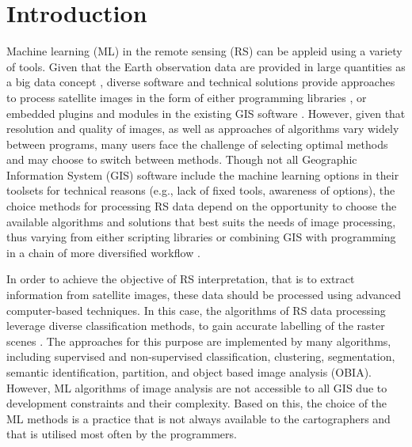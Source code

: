 \documentclass[final,5p,times,twocolumn]{elsarticle}
\begin{document}
\section{Introduction}

Machine learning (ML) in the remote sensing (RS) can be appleid using a variety of tools. Given that the Earth observation data are provided in large quantities as a big data concept \cite{LI2023103345,YIN2021102514,HUANG20181915}, diverse software and technical solutions provide approaches to process satellite images in the form of either programming libraries \cite{9884758,Lemenkova202306,9297369,9553880}, or embedded plugins and modules in the existing GIS software \cite{Lemenkova202307,rs15041148}. However, given that resolution and quality of images, as well as approaches of algorithms vary widely between programs, many users face the challenge of selecting optimal methods and may choose to switch between methods. Though not all Geographic Information System (GIS) software include the machine learning options in their toolsets for technical reasons (e.g., lack of fixed tools, awareness of options), the choice methods  for processing RS data depend on the opportunity to choose the available algorithms and solutions that best suits the needs of image processing, thus varying from either scripting libraries or combining GIS with programming in a chain of more diversified workflow \citep{5070195,Lemenkova202227,4736879,6049966,Lemenkova202301,6910592}.

In order to achieve the objective of RS interpretation, that is to extract information from satellite images, these data should be processed using advanced computer-based techniques. In this case, the algorithms of RS data processing leverage diverse classification methods, to gain accurate labelling of the raster scenes \cite{su151813786,Lemenkova202229}. The approaches for this purpose are implemented by many algorithms, including supervised and non-supervised classification, clustering, segmentation, semantic identification, partition, and object based image analysis (OBIA). However, ML algorithms of image analysis are not accessible to all GIS due to development constraints and their complexity. Based on this, the choice of the ML methods is a practice that is not always available to the cartographers and that is utilised most often by the programmers.
\end{document}
